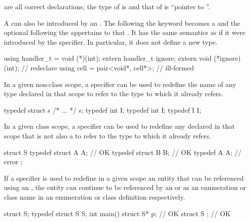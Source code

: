 are all correct declarations; the type of  is
 and that of  is ``pointer to ''.
\exitexample

\pnum
A  can also be introduced by an
. The  following the
 keyword becomes a 
and the optional  following the
 appertains to that .
It has the same
semantics as if it were introduced by the  specifier. In
particular, it does not define a new type.
\enterexample

\begin{codeblock}
using handler_t = void (*)(int);
extern handler_t ignore;
extern void (*ignore)(int);         // redeclare 
using cell = pair<void*, cell*>;    // ill-formed
\end{codeblock}

\exitexample

\pnum
{}%
In a given non-class scope, a  specifier can be used to
redefine the name of any type declared in that scope to refer to the
type to which it already refers.
\enterexample

\begin{codeblock}
typedef struct s { /* ... */ } s;
typedef int I;
typedef int I;
typedef I I;
\end{codeblock}
\exitexample

\pnum
In a given class scope, a  specifier can be used to
redefine any  declared in that scope that is not
also a  to refer to the type to which it already
refers.
\enterexample

\begin{codeblock}
struct S {
  typedef struct A { } A;       // OK
  typedef struct B B;           // OK
  typedef A A;                  // error
};
\end{codeblock}
\exitexample

\pnum
If a  specifier is used to redefine in a given scope an
entity that can be referenced using an ,
the entity can continue to be referenced by an
 or as an enumeration or class name
in an enumeration or class definition respectively. \enterexample
\begin{codeblock}
struct S;
typedef struct S S;
int main() {
  struct S* p;                  // OK
}
struct S { };                   // OK
\end{codeblock}
\exitexample

